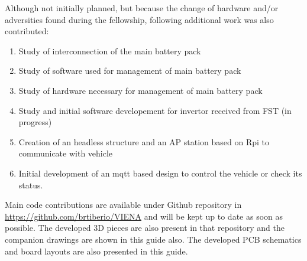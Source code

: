 Although not initially planned, but because the change of hardware and/or adversities found during the fellowship, following additional work was also contributed:
\begin{enumerate}
	\tightlist
	\item Study of interconnection of the main battery pack
	\item Study of software used for management of main battery pack
	\item Study of hardware necessary for management of main battery pack
	\item Study and initial software developement  for invertor received from \acrshort{FST} (in progress)
	\item Creation of an headless structure and an AP station based on \gls{Rpi} to communicate with vehicle
	\item Initial development of an mqtt based design to control the vehicle or check its status. 
\end{enumerate}

Main code contributions are available under Github repository in \url{https://github.com/brtiberio/VIENA} and will be kept up to date as soon as possible.
The developed 3D pieces are also present in that repository and the companion drawings are shown in this guide also.
The developed PCB schematics and board layouts are also presented in this guide.





